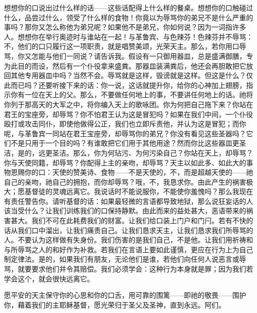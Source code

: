 想想你的口说出过什么样的话——这些话配得上什么样的餐桌。想想你的口触碰过什么，品尝过什么，领受了什么样的食物！你竟以为辱骂你的弟兄不是什么严重的事吗？那你又怎么称他为弟兄呢？如果他不是弟兄，你如何说？因为一词指许多人。想想你在举行奥迹时与谁站在一起！与革鲁宾、与色辣芬！色辣芬并不辱骂：不，他们的口只履行这一项职责，就是唱赞美颂，光荣天主。那么，若你用口辱骂，你又怎能与他们一同说？请告诉我。假设有一只御用器皿，总是盛满御膳，专为此目的而设，然后有一个仆役拿来盛粪。那器皿装满粪后，他还会再胆敢把它放回其他专用器皿中吗？当然不会。辱骂就是这样，毁谤就是这样。但这是什么？仅此而已吗？还要听接下来的话：你一说，这话就提升你，给你的心神加上翅膀，指示你有一位在天上的父。那么，不要做任何地上的事，不要讲任何地上的话。祂将你列于那高天的大军之中，将你编入天上的歌咏团。你为何把自己拖下来？你站在君王的宝座旁，却辱骂？你不怕君王认为这是冒犯吗？如果在我们中间，一个仆役殴打或攻击同仆，即使他做得公正，我们也立即斥责他，并认为这是冒犯；而你呢，与革鲁宾一同站在君王宝座旁，却辱骂你的弟兄？你没有看见这些圣器吗？它们不是只用于一个目的吗？有谁敢把它们用于其他用途？然而你比这些器皿更圣洁，是的，远更圣洁。那么，你为何玷污、为何污染自己？你站在天上，却辱骂？你与天使同籍，却辱骂？你配得上主的亲吻，却辱骂？天主以如此多、如此大的事物恩赐你的口：天使的赞美诗、食物——不是天使的，不，而是超越天使的——祂自己的亲吻，祂自己的拥抱，而你却辱骂？哦，不，我恳求你。由此产生的祸害极大；愿基督徒的灵魂远离它。我说话时不能说服你，不能使你羞愧吗？那么我现在有责任警告你。请听基督的话：如果最轻微的言语都导致地狱，那么说狂妄话的人该当受什么？让我们训练我们的口保持静默。由此而来的益处甚大，恶语带来的祸害甚大。我们不可在此耗费我们的财富。让我们给口装上门户和门闩。若有不快的话从我们口中溜出，让我们痛责自己。让我们恳求天主，让我们恳求我们所辱骂的人。不要认为这样做有失身份。我们伤害的是我们自己，不是他。让我们用祈祷和与所辱骂之人的和好作为补救。若我们在言语上要如此谨慎，更应在行为上为自己制定律法。是的，如果我们有朋友，无论他们是谁，若他们向任何人说恶言或辱骂，就要要求他们并令其赔偿。我们必须学会：这种行为本身就是罪；因为我们若学会这个，就会很快远离它。\par

愿平安的天主保守你的心思和你的口舌，用可靠的围篱——即祂的敬畏——围护你，藉着我们的主耶稣基督，愿光荣归于圣父及圣神，直到永远。阿们。\par


